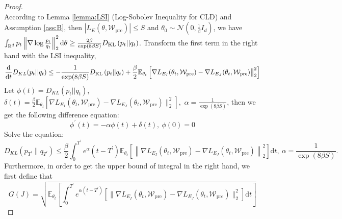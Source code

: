 \begin{proof}
$$	$$
	According to Lemma \ref{lemma:LSI} (Log-Sobolev Inequality for CLD) and Assumption \ref{ass:B}, then $\left|L_E(\theta,\mathcal{W}_{\text{pre}})\right|\leq S$ and $\theta_0 \sim \mathcal{N}(0,\frac{1}{\beta}I_d)$, we have $\int_{\mathbb{R}^d}p_t\left\|\nabla\log\frac{p_t}{q_t}\right\|_2^2\mathrm{d}\theta \geq \frac{2\beta}{\exp(8\beta S)}D_{\mathrm{KL}}\left(p_t||q_t\right)$. Transform the first term in the right hand with the LSI inequality,
	$$
	\frac{\mathrm{d}}{\mathrm{d}t}D_{KL}(p_t||q_t) \leq -\frac{1}{\exp(8\beta S)}D_{\mathrm{KL}}\left(p_t||q_t\right)+\frac{\beta}{2}\mathbb{E}_{\theta_t}\left[\nabla L_{E_I}(\theta_t, \mathcal{W}_{\text{pre}})-\nabla L_{E_J}(\theta_t, \mathcal{W}_{\text{pre}})\big\|^2_2\right]
	$$
	Let $\phi(t)=D_{KL}(p_t||q_t)$, $\delta(t)=\frac{\beta}{2}\mathbb{E}_{\theta_t}\left[\nabla L_{E_I}(\theta_t, \mathcal{W}_{\text{pre}})-\nabla L_{E_J}(\theta_t, \mathcal{W}_{\text{pre}})\big\|^2_2\right],$ $\alpha=\frac{1}{\exp(8\beta S)}$, then we get the following difference equation:
	$$
	\phi^{\prime}(t) = -\alpha \phi(t) + \delta(t),\ \phi(0)=0
	$$
	Solve the equation:
	$$
	D_{KL}\left(p_{T^\prime}\parallel q_{T^\prime}\right)\leq\frac\beta2\int_0^{T^\prime}e^\alpha(t-{T^\prime})\mathbb{E}_{\theta_t}\left[\left\|\nabla L_{E_I}(\theta_t, \mathcal{W}_{\text{pre}})-\nabla L_{E_J}(\theta_t, \mathcal{W}_{\text{pre}})\right\|_2^2\right]\mathrm{d}t,\ \alpha=\frac{1}{\exp(8\beta S)}.
	$$
	Furthermore, in order to get the upper bound of integral in the right hand, we first define that
	$$
	G(J) = \sqrt{\mathbb{E}_{\theta_t}\left[\int_0^{T^\prime} e^{\alpha(t-{T^\prime})}\left[\big\|\nabla L_{E_I}(\theta_t, \mathcal{W}_{\text{pre}})-\nabla L_{E_J}(\theta_t, \mathcal{W}_{\text{pre}})\big\|_2^2\right]\mathrm{d}t\right]}
	$$
	

\end{proof}

